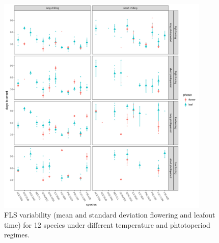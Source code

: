 \documentclass[12pt]{article}\usepackage[]{graphicx}\usepackage[]{color}
\begin{document}
\begin{center}
\begin{figure}[here]
\includegraphics[width=0.9\textwidth]{..//figures/raw_plots_final.pdf}
\caption{ FLS variability (mean and standard deviation flowering and leafout time) for 12 species under different temperature and phtotoperiod regimes.}
\label{fig:Figure 4}
\end{figure}
\end{center}
%
%
\end{document}
